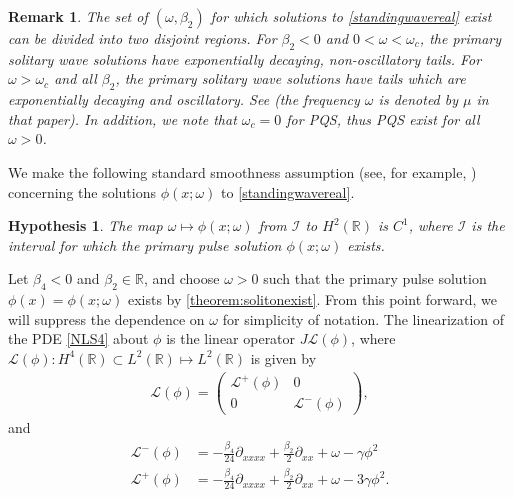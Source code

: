 \documentclass[12pt]{elsarticle}
\def\noi{\noindent}
\def\R{{\mathbb R}}
\def\calL{{\mathcal L}}
\def\calI{{\mathcal I}}
\newtheorem{hypothesis}{Hypothesis}
\newtheorem{remark}{Remark}
\begin{document}
\begin{remark}\label{remark:soliton}
The set of $(\omega, \beta_2)$ for which solutions to \cref{standingwavereal} exist can be divided into two disjoint regions. For $\beta_2 < 0$ and $0 < \omega < \omega_c$, the primary solitary wave solutions have exponentially decaying, non-oscillatory tails. For $\omega > \omega_c$ and all $\beta_2$, the primary solitary wave solutions have tails which are exponentially decaying and oscillatory. See \cite[Figure 2(a)]{Tam2020} (the frequency $\omega$ is denoted by $\mu$ in that paper). In addition, we note that $\omega_c = 0$ for PQS, thus PQS exist for all $\omega > 0$.
\end{remark}

\noi We make the following standard smoothness assumption (see, for example, \cite[Assumption 2]{Grillakis1987}) concerning the solutions $\phi(x; \omega)$ to \cref{standingwavereal}.

\begin{hypothesis}\label{hyp:smoothmap}
The map $\omega \mapsto \phi(x; \omega)$ from $\calI$ to $H^2(\R)$ is $C^1$, where $\calI$ is the interval for which the primary pulse solution $\phi(x; \omega)$ exists.
\end{hypothesis}

Let $\beta_4 < 0$ and $\beta_2 \in \R$, and choose $\omega > 0$ such that the primary pulse solution $\phi(x) = \phi(x; \omega)$ exists by \cref{theorem:solitonexist}. From this point forward, we will suppress the dependence on $\omega$ for simplicity of notation. The linearization of the PDE \cref{NLS4} about $\phi$ is the linear operator $J \calL(\phi)$, where $\calL(\phi): H^4(\R) \subset L^2(\R) \mapsto L^2(\R)$ is given by
\begin{align}\label{defLphi}
\calL(\phi) = 
\begin{pmatrix}
\calL^+(\phi) & 0 \\
0 & \calL^-(\phi)
\end{pmatrix},
\end{align}
and
\begin{align*}
\calL^-(\phi) &= -\frac{\beta_4}{24} \partial_{xxxx} + \frac{\beta_2}{2} \partial_{xx} + \omega - \gamma \phi^2 \\
\calL^+(\phi) &= -\frac{\beta_4}{24} \partial_{xxxx} + \frac{\beta_2}{2} \partial_{xx} + \omega - 3 \gamma \phi^2.
\end{align*}
\end{document}
